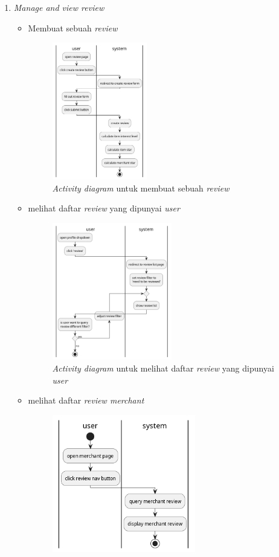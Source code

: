 \documentclass[a4paper]{article}
\begin{document}
\begin{enumerate}
\begin{enumerate}
        \item \textit{Manage and view review}
        \begin{itemize}
            \item Membuat sebuah \textit{review}
            \begin{figure}[h]
                \centering
                \includegraphics*[height=6cm]{./diagram/activity diagram/16. review/create review/create review.png}
                \caption{\textit{Activity diagram} untuk membuat sebuah \textit{review}}
            \end{figure}
            \item melihat daftar \textit{review} yang dipunyai \textit{user}
            \begin{figure}[h]
                \centering
                \includegraphics*[height=6cm]{./diagram/activity diagram/16. review/view user review/view user review list.png}
                \caption{\textit{Activity diagram} untuk melihat daftar \textit{review} yang dipunyai \textit{user}}
            \end{figure}
            \newpage
            \item melihat daftar \textit{review merchant}
            \begin{figure}[h]
                \centering
                \includegraphics*[height=6cm]{./diagram/activity diagram/16. review/view merchant review/merchant review.png}

\end{figure}
\end{itemize}
\end{enumerate}
\end{enumerate}
\end{document}
